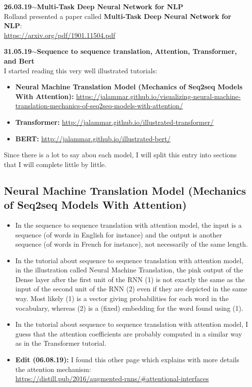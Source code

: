 \documentclass[11pt,a4paper]{article}
\newenvironment{loggentry}[2]%
{\noindent\textbf{#1}\hspace{1cm}$\mathbf{\sim}$\text{ }\textbf{#2}\\}{\vspace{0.5cm}}
\begin{document}
\begin{loggentry}{26.03.19}{Multi-Task Deep Neural Network for NLP}

Rolland presented a paper called \textbf{Multi-Task Deep Neural Network for NLP}:\\
\url{https://arxiv.org/pdf/1901.11504.pdf}\\

\end{loggentry}


\begin{loggentry}{31.05.19}{Sequence to sequence translation, Attention, Transformer, and Bert}

I started reading this very well illustrated tutorials:
\begin{itemize}
\item \textbf{Neural Machine Translation Model (Mechanics of Seq2seq Models With Attention):} \url{https://jalammar.github.io/visualizing-neural-machine-translation-mechanics-of-seq2seq-models-with-attention/}
\item \textbf{Transformer:} \url{http://jalammar.github.io/illustrated-transformer/}
\item \textbf{BERT:} \url{http://jalammar.github.io/illustrated-bert/}
\end{itemize}

Since there is a lot to say abou each model, I will split this entry into sections that I will complete little by little.


\subsection{Neural Machine Translation Model (Mechanics of Seq2seq Models With Attention)}

\begin{itemize}
\item In the sequence to sequence translation with attention model, the input is a sequence (of words in English for instance) and the output is another sequence (of words in French for instance), not necessarily of the same length.
\item In the tutorial about sequence to sequence translation with attention model, in the illustration called Neural Machine Translation, the pink output of the Dense layer after the first unit of the RNN (1) is not exactly the same as the input of the second unit of the RNN (2) even if they are depicted in the same way. Most likely (1) is a vector giving probabilities for each word in the vocabulary, whereas (2) is a (fixed) embedding for the word found using (1).
\item In the tutorial about sequence to sequence translation with attention model, I guess that the attention coefficients are probably computed in a similar way as in the Transformer tutorial.
\item \textbf{Edit (06.08.19):} I found this other page which explains with more details the attention mechanism:\\
\url{https://distill.pub/2016/augmented-rnns/#attentional-interfaces}
\end{itemize}



\end{loggentry}
\end{document}
